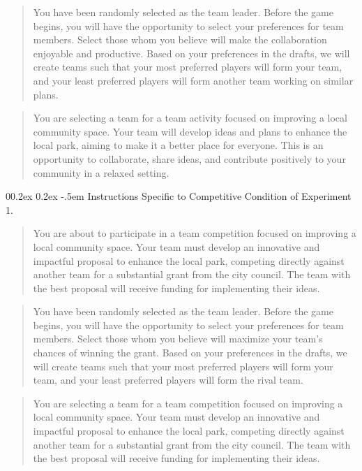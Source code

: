 \documentclass[
  man,
  floatsintext,
  longtable,
  nolmodern,
  notxfonts,
  notimes,
  draftfirst,
  colorlinks=true,linkcolor=blue,citecolor=blue,urlcolor=blue]{apa7}
\makeatletter
\renewcommand{\paragraph}{\@startsection{paragraph}{4}{\parindent}%
	{0\baselineskip \@plus 0.2ex \@minus 0.2ex}%
	{-.5em}%
	{\normalfont\normalsize\bfseries\typesectitle}}
\makeatother
\begin{document}
\begin{quote}
You have been randomly selected as the team leader. Before the game
begins, you will have the opportunity to select your preferences for
team members. Select those whom you believe will make the collaboration
enjoyable and productive. Based on your preferences in the drafts, we
will create teams such that your most preferred players will form your
team, and your least preferred players will form another team working on
similar plans.
\end{quote}

\begin{quote}
You are selecting a team for a team activity focused on improving a
local community space. Your team will develop ideas and plans to enhance
the local park, aiming to make it a better place for everyone. This is
an opportunity to collaborate, share ideas, and contribute positively to
your community in a relaxed setting.
\end{quote}

\paragraph{Instructions Specific to Competitive Condition of Experiment
1.}\label{instructions-specific-to-competitive-condition-of-experiment-1}

\begin{quote}
You are about to participate in a team competition focused on improving
a local community space. Your team must develop an innovative and
impactful proposal to enhance the local park, competing directly against
another team for a substantial grant from the city council. The team
with the best proposal will receive funding for implementing their
ideas.
\end{quote}

\begin{quote}
You have been randomly selected as the team leader. Before the game
begins, you will have the opportunity to select your preferences for
team members. Select those whom you believe will maximize your team's
chances of winning the grant. Based on your preferences in the drafts,
we will create teams such that your most preferred players will form
your team, and your least preferred players will form the rival team.
\end{quote}

\begin{quote}
You are selecting a team for a team competition focused on improving a
local community space. Your team must develop an innovative and
impactful proposal to enhance the local park, competing directly against
another team for a substantial grant from the city council. The team
with the best proposal will receive funding for implementing their
ideas.
\end{quote}
\end{document}

